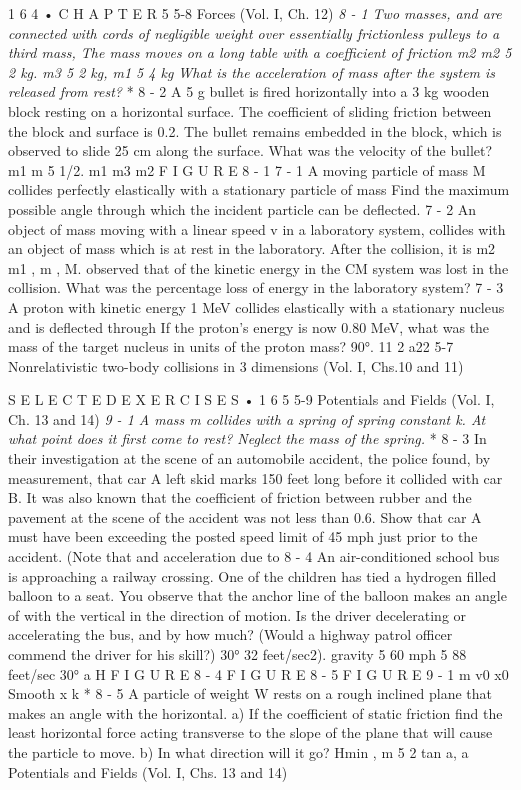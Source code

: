\documentclass[10pt,oneside]{article}
\begin{document}
1 6 4 • C H A P T E R  5 5-8 Forces (Vol. I, Ch. 12) \emph{ 8 - 1 Two masses, and are connected with cords of negligible weight over essentially frictionless pulleys to a third mass, The mass moves on a long table with a coefficient of friction m2 m2 5 2 kg. m3 5 2 kg, m1 5 4 kg What is the acceleration of mass after the system is released from rest? } * 8 - 2 A 5 g bullet is fired horizontally into a 3 kg wooden block resting on a horizontal surface. The coefficient of sliding friction between the block and surface is 0.2. The bullet remains embedded in the block, which is observed to slide 25 cm along the surface. What was the velocity of the bullet? m1 m 5 1/2. m1 m3 m2 F I G U R E  8 - 1 \emph{ } 7 - 1 A moving particle of mass M collides perfectly elastically with a stationary particle of mass Find the maximum possible angle through which the incident particle can be deflected. \emph{ } 7 - 2 An object of mass moving with a linear speed v in a laboratory system, collides with an object of mass which is at rest in the laboratory. After the collision, it is m2 m1 , m , M. observed that of the kinetic energy in the CM system was lost in the collision. What was the percentage loss of energy in the laboratory system? \emph{ } 7 - 3 A proton with kinetic energy 1 MeV collides elastically with a stationary nucleus and is deflected through If the proton’s energy is now 0.80 MeV, what was the mass of the target nucleus in units of the proton mass? 90°. 11 2 a22 5-7 Nonrelativistic two-body collisions in 3 dimensions (Vol. I, Chs.10 and 11)\par

S E L E C T E D  E X E R C I S E S • 1 6 5 5-9 Potentials and Fields (Vol. I, Ch. 13 and 14) \emph{ 9 - 1 A mass m collides with a spring of spring constant k. At what point does it first come to rest? Neglect the mass of the spring. } * 8 - 3 In their investigation at the scene of an automobile accident, the police found, by measurement, that car A left skid marks 150 feet long before it collided with car B. It was also known that the coefficient of friction between rubber and the pavement at the scene of the accident was not less than 0.6. Show that car A must have been exceeding the posted speed limit of 45 mph just prior to the accident. (Note that and acceleration due to \emph{ } 8 - 4 An air-conditioned school bus is approaching a railway crossing. One of the children has tied a hydrogen filled balloon to a seat. You observe that the anchor line of the balloon makes an angle of with the vertical in the direction of motion. Is the driver decelerating or accelerating the bus, and by how much? (Would a highway patrol officer commend the driver for his skill?) 30° 32 feet/sec2). gravity 5 60 mph 5 88 feet/sec 30° a H F I G U R E  8 - 4 F I G U R E  8 - 5 F I G U R E  9 - 1 m v0 x0 Smooth x k \emph{ } * 8 - 5 A particle of weight W rests on a rough inclined plane that makes an angle with the horizontal. a) If the coefficient of static friction find the least horizontal force acting transverse to the slope of the plane that will cause the particle to move. b) In what direction will it go? Hmin , m 5 2 tan a, a Potentials and Fields (Vol. I, Chs. 13 and 14)\par
\end{document}
